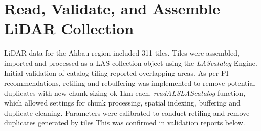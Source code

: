 \documentclass[
]{article}
\newenvironment{Shaded}{\begin{snugshade}}{\end{snugshade}}
\newcommand{\AttributeTok}[1]{\textcolor[rgb]{0.77,0.63,0.00}{#1}}
\newcommand{\ConstantTok}[1]{\textcolor[rgb]{0.00,0.00,0.00}{#1}}
\newcommand{\ControlFlowTok}[1]{\textcolor[rgb]{0.13,0.29,0.53}{\textbf{#1}}}
\newcommand{\FunctionTok}[1]{\textcolor[rgb]{0.00,0.00,0.00}{#1}}
\newcommand{\NormalTok}[1]{#1}
\newcommand{\OtherTok}[1]{\textcolor[rgb]{0.56,0.35,0.01}{#1}}
\newcommand{\StringTok}[1]{\textcolor[rgb]{0.31,0.60,0.02}{#1}}
\begin{document}
\begin{Shaded}
\end{Shaded}

\hypertarget{read-validate-and-assemble-lidar-collection}{%
\section{Read, Validate, and Assemble LiDAR
Collection}\label{read-validate-and-assemble-lidar-collection}}

LiDAR data for the Ahbau region included 311 tiles. Tiles were
assembled, imported and processed as a LAS collection object using the
\emph{LAScatalog} Engine. Initial validation of catalog tiling reported
overlapping areas. As per PI recommendations, retiling and rebuffering
was implemented to remove potential duplicates with new chunk sizing ok
1km each, \emph{readALSLAScatalog} function, which allowed settings for
chunk processing, spatial indexing, buffering and duplicate cleaning.
Parameters were calibrated to conduct retiling and remove duplicates
generated by tiles This was confirmed in validation reports below.
\end{document}
